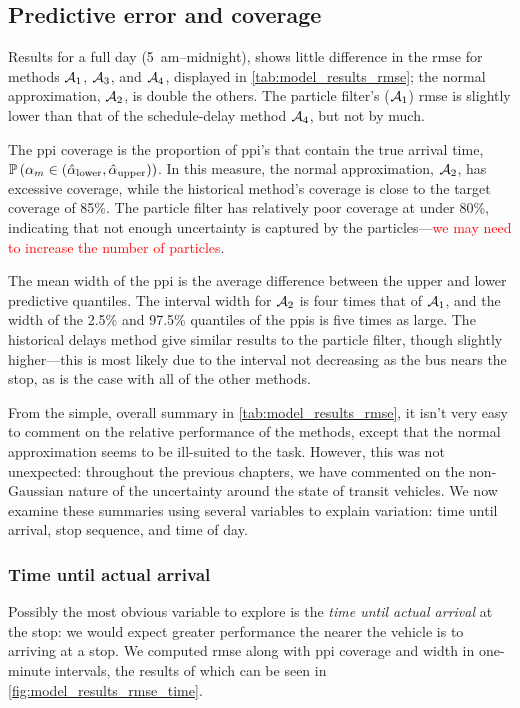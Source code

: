 \subsection{Predictive error and coverage}
\label{sec:prediction_model_comp_stats}

Results for a full day (5~am--midnight), shows little difference in the \gls{rmse} for methods $\mathcal{A}_1$, $\mathcal{A}_3$, and $\mathcal{A}_4$, displayed in \cref{tab:model_results_rmse}; the normal approximation, $\mathcal{A}_2$, is double the others. The particle filter's ($\mathcal{A}_1$) \gls{rmse} is slightly lower than that of the schedule-delay method $\mathcal{A}_4$, but not by much.

The \gls{ppi} coverage is the proportion of \gls{ppi}'s that contain the true arrival time, $\mathbb{P}\left(\alpha_m \in (\hat\alpha_{\text{lower}},\hat\alpha_{\text{upper}})\right)$. In this measure, the normal approximation, $\mathcal{A}_2$, has excessive coverage, while the historical method's coverage is close to the target coverage of 85\%. The particle filter has relatively poor coverage at under 80\%, indicating that not enough uncertainty is captured by the particles---\textcolor{red}{we may need to increase the number of particles}.

The mean width of the \gls{ppi} is the average difference between the upper and lower predictive quantiles. The interval width for $\mathcal{A}_2$ is four times that of $\mathcal{A}_1$, and the width of the 2.5\% and 97.5\% quantiles of the \glspl{ppi} is five times as large. The historical delays method give similar results to the particle filter, though slightly higher---this is most likely due to the interval not decreasing as the bus nears the stop, as is the case with all of the other methods.

From the simple, overall summary in \cref{tab:model_results_rmse}, it isn't very easy to comment on the relative performance of the methods, except that the normal approximation seems to be ill-suited to the task. However, this was not unexpected: throughout the previous chapters, we have commented on the non-Gaussian nature of the uncertainty around the state of transit vehicles. We now examine these summaries using several variables to explain variation: time until arrival, stop sequence, and time of day.


\subsubsection{Time until actual arrival}

Possibly the most obvious variable to explore is the \emph{time until actual arrival} at the stop: we would expect greater performance the nearer the vehicle is to arriving at a stop. We computed \gls{rmse} along with \gls{ppi} coverage and width in one-minute intervals, the results of which can be seen in \cref{fig:model_results_rmse_time}.


